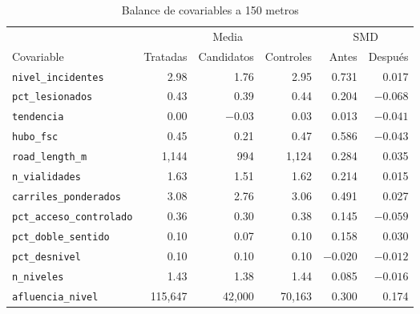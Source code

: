 \begin{table}[htbp]
    \centering
    \caption{Balance de covariables a 150 metros}
    \label{tab:balance-150}
    \footnotesize
    \setlength{\tabcolsep}{4pt}
    \begin{tabular}{l r r r r r}
        \toprule
        & \multicolumn{3}{c}{Media} & \multicolumn{2}{c}{SMD} \\
        \cmidrule(lr){2-4} \cmidrule(lr){5-6}
        Covariable & Tratadas & Candidatos & Controles & Antes & Después \\
        \midrule
        \texttt{nivel\_incidentes} & 2.98 & 1.76 & 2.95 & 0.731 & 0.017 \\
        \texttt{pct\_lesionados} & 0.43 & 0.39 & 0.44 & 0.204 & $-0.068$ \\
        \texttt{tendencia} & 0.00 & $-0.03$ & 0.03 & 0.013 & $-0.041$ \\
        \texttt{hubo\_fsc} & 0.45 & 0.21 & 0.47 & 0.586 & $-0.043$ \\
        \texttt{road\_length\_m} & 1,144 & 994 & 1,124 & 0.284 & 0.035 \\
        \texttt{n\_vialidades} & 1.63 & 1.51 & 1.62 & 0.214 & 0.015 \\
        \texttt{carriles\_ponderados} & 3.08 & 2.76 & 3.06 & 0.491 & 0.027 \\
        \texttt{pct\_acceso\_controlado} & 0.36 & 0.30 & 0.38 & 0.145 & $-0.059$ \\
        \texttt{pct\_doble\_sentido} & 0.10 & 0.07 & 0.10 & 0.158 & 0.030 \\
        \texttt{pct\_desnivel} & 0.10 & 0.10 & 0.10 & $-0.020$ & $-0.012$ \\
        \texttt{n\_niveles} & 1.43 & 1.38 & 1.44 & 0.085 & $-0.016$ \\
        \texttt{afluencia\_nivel} & 115,647 & 42,000 & 70,163 & 0.300 & 0.174 \\
        \bottomrule
    \end{tabular}
\end{table}

